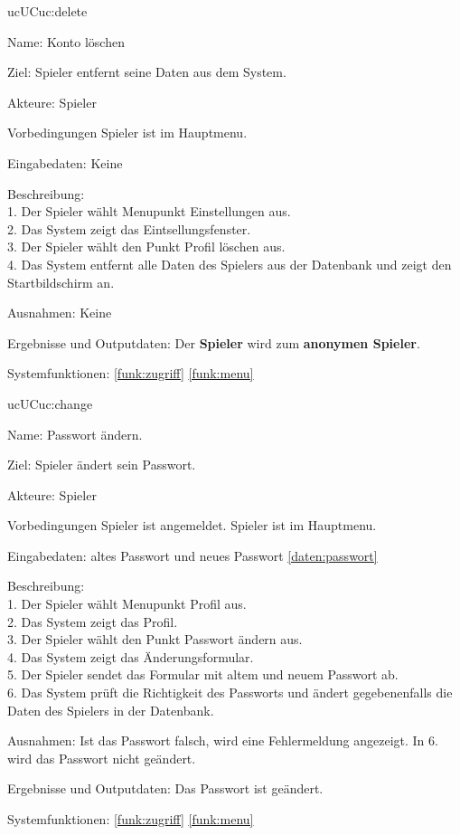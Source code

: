 \begin{description}[leftmargin=5em, style=sameline]
	\begin{lhp}{uc}{UC}{uc:delete}
		\item [Name:] Konto löschen
		\item [Ziel:] Spieler entfernt seine Daten aus dem System.
		\item [Akteure:] Spieler
		\item [Vorbedingungen] Spieler ist im Hauptmenu.
		\item [Eingabedaten:] Keine
		\item [Beschreibung:] \hfill\\
				1. Der Spieler wählt Menupunkt Einstellungen aus.\\
				2. Das System zeigt das Eintsellungsfenster.\\
				3. Der Spieler wählt den Punkt Profil löschen aus.\\
				4. Das System entfernt alle Daten des Spielers aus der Datenbank und zeigt den Startbildschirm an.
		\item [Ausnahmen:] Keine
		\item [Ergebnisse und Outputdaten:] Der \textbf{Spieler} wird zum \textbf{anonymen Spieler}.
		\item [Systemfunktionen:] \ref{funk:zugriff} \ref{funk:menu}
	\end{lhp}

	\begin{lhp}{uc}{UC}{uc:change}
		\item [Name:] Passwort ändern.
		\item [Ziel:] Spieler ändert sein Passwort.
		\item [Akteure:] Spieler
		\item [Vorbedingungen] Spieler ist angemeldet. Spieler ist im Hauptmenu.
		\item [Eingabedaten:] altes Passwort und neues Passwort \ref{daten:passwort}
		\item [Beschreibung:] \hfill\\
				1. Der Spieler wählt Menupunkt Profil aus.\\
				2. Das System zeigt das Profil.\\
				3. Der Spieler wählt den Punkt Passwort ändern aus.\\
				4. Das System zeigt das Änderungsformular.\\
				5. Der Spieler sendet das Formular mit altem und neuem Passwort ab.\\
				6. Das System prüft die Richtigkeit des Passworts und ändert gegebenenfalls die Daten des Spielers in der Datenbank.
		\item [Ausnahmen:] Ist das Passwort falsch, wird eine Fehlermeldung angezeigt. In 6. wird das Passwort nicht geändert.
		\item [Ergebnisse und Outputdaten:] Das Passwort ist geändert.
		\item [Systemfunktionen:] \ref{funk:zugriff} \ref{funk:menu}
	\end{lhp}
	

\end{description}
